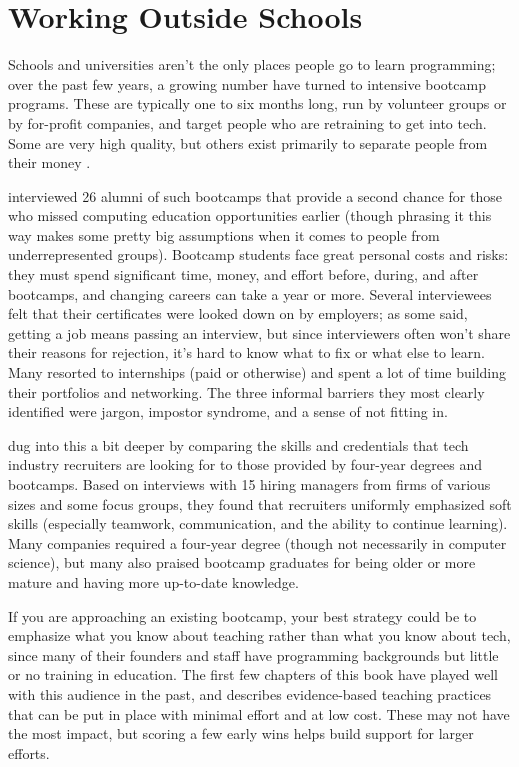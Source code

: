 \section{Working Outside Schools}\label{s:partner-outside}

Schools and universities aren't the only places people go to learn programming;
over the past few years, a growing number have turned to intensive bootcamp programs.
These are typically one to six months long,
run by volunteer groups or by for-profit companies,
and target people who are retraining to get into tech.
Some are very high quality,
but others exist primarily to separate people from their money \cite{McMi2017}.

\cite{Thay2017} interviewed 26 alumni of such bootcamps
that provide a second chance for those who missed computing education opportunities earlier
(though phrasing it this way makes some pretty big assumptions
when it comes to people from underrepresented groups).
Bootcamp students face great personal costs and risks:
they must spend significant time, money, and effort before, during, and after bootcamps,
and changing careers can take a year or more.
Several interviewees felt that their certificates were looked down on by employers;
as some said,
getting a job means passing an interview,
but since interviewers often won't share their reasons for rejection,
it's hard to know what to fix or what else to learn.
Many resorted to internships (paid or otherwise)
and spent a lot of time building their portfolios and networking.
The three informal barriers they most clearly identified were jargon,
impostor syndrome,
and a sense of not fitting in.

\cite{Burk2018} dug into this a bit deeper
by comparing the skills and credentials that tech industry recruiters are looking for
to those provided by four-year degrees and bootcamps.
Based on interviews with 15 hiring managers from firms of various sizes and some focus groups,
they found that recruiters uniformly emphasized soft skills
(especially teamwork, communication, and the ability to continue learning).
Many companies required a four-year degree
(though not necessarily in computer science),
but many also praised bootcamp graduates for being older or more mature
and having more up-to-date knowledge.

If you are approaching an existing bootcamp,
your best strategy could be to emphasize what you know about teaching
rather than what you know about tech,
since many of their founders and staff have programming backgrounds
but little or no training in education.
The first few chapters of this book have played well with this audience in the past,
and \cite{Lang2016} describes
evidence-based teaching practices that can be put in place
with minimal effort and at low cost.
These may not have the most impact,
but scoring a few early wins helps build support for larger efforts.

